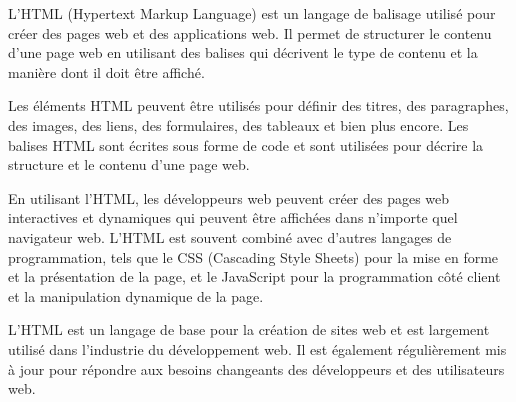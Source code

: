 L'HTML (Hypertext Markup Language) est un langage de balisage utilisé pour créer des pages web et des applications web. Il permet de structurer le contenu d'une page web en utilisant des balises qui décrivent le type de contenu et la manière dont il doit être affiché.

Les éléments HTML peuvent être utilisés pour définir des titres, des paragraphes, des images, des liens, des formulaires, des tableaux et bien plus encore. Les balises HTML sont écrites sous forme de code et sont utilisées pour décrire la structure et le contenu d'une page web.

En utilisant l'HTML, les développeurs web peuvent créer des pages web interactives et dynamiques qui peuvent être affichées dans n'importe quel navigateur web. L'HTML est souvent combiné avec d'autres langages de programmation, tels que le CSS (Cascading Style Sheets) pour la mise en forme et la présentation de la page, et le JavaScript pour la programmation côté client et la manipulation dynamique de la page.

L'HTML est un langage de base pour la création de sites web et est largement utilisé dans l'industrie du développement web. Il est également régulièrement mis à jour pour répondre aux besoins changeants des développeurs et des utilisateurs web.